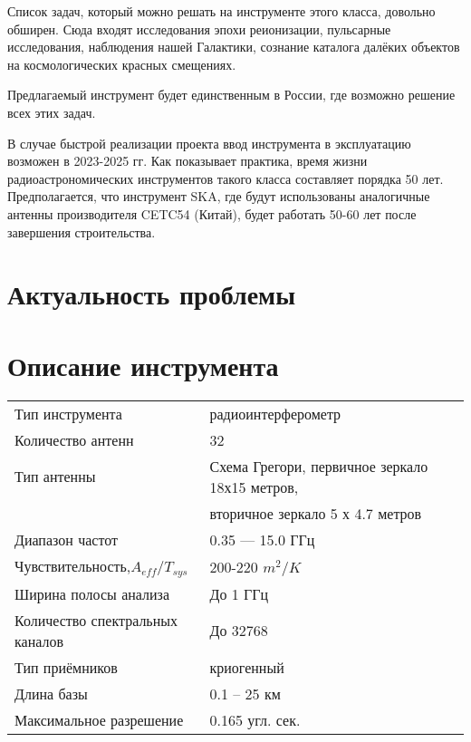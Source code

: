 \documentclass[10pt,a4paper]{article}
\begin{document}
Список задач, который можно решать на инструменте этого класса, довольно обширен. Сюда входят исследования эпохи реионизации, пульсарные исследования, наблюдения нашей Галактики, сознание каталога далёких объектов на космологических красных смещениях.

Предлагаемый инструмент будет единственным в России, где возможно решение всех этих задач.

В случае быстрой реализации проекта ввод инструмента в эксплуатацию возможен в 2023-2025 гг. Как показывает практика, время жизни радиоастрономических инструментов такого класса составляет порядка 50 лет. Предполагается, что инструмент SKA, где будут использованы аналогичные антенны производителя CETC54 (Китай), будет работать 50-60 лет после завершения строительства.

\section{Актуальность проблемы}

\section{Описание инструмента}

\begin{minipage}{\linewidth}
\bigskip
\centering
{} \label{tab:rif32} 
\begin{tabular}{l|l}
  \hline
  Тип инструмента & радиоинтерферометр \\
  Количество антенн & 32 \\
  Тип антенны & Схема Грегори, первичное зеркало 18х15 метров, \\ 
  & вторичное зеркало 5 х 4.7 метров \\
  Диапазон частот & 0.35 — 15.0 ГГц \\
  Чувствительность,$A_{eff}/T_{sys}$ & 200-220 $m^2/K$ \\
  Ширина полосы анализа &	До 1 ГГц \\
  Количество спектральных каналов & До 32768 \\
  Тип приёмников & криогенный \\
  Длина базы & 0.1 – 25 км \\
  Максимальное разрешение & 0.165 угл. сек.\\
  \hline
\end{tabular}
\bigskip
\end{minipage}
\end{document}
